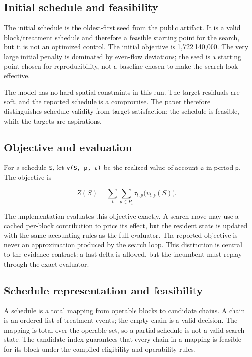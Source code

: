 \documentclass[11pt]{article}
\begin{document}
\subsection{Initial schedule and feasibility}\label{initial-schedule-and-feasibility}

The initial schedule is the oldest-first seed from the public artifact. It is a valid block/treatment schedule and therefore a feasible starting point for the search, but it is not an optimized control. The initial objective is 1,722,140,000. The very large initial penalty is dominated by even-flow deviations; the seed is a starting point chosen for reproducibility, not a baseline chosen to make the search look effective.

The model has no hard spatial constraints in this run. The target residuals are soft, and the reported schedule is a compromise. The paper therefore distinguishes schedule validity from target satisfaction: the schedule is feasible, while the targets are aspirations.

\subsection{Objective and evaluation}\label{objective-and-evaluation}

For a schedule \texttt{S}, let \texttt{v(S,\ p,\ a)} be the realized value of account \texttt{a} in period \texttt{p}. The objective is

\begin{equation}
Z(S) = \sum_{t}\sum_{p\in P_t} \tau_{t,p}\bigl(v_{t,p}(S)\bigr).
\end{equation}

The implementation evaluates this objective exactly. A search move may use a cached per-block contribution to price its effect, but the resident state is updated with the same accounting rules as the full evaluator. The reported objective is never an approximation produced by the search loop. This distinction is central to the evidence contract: a fast delta is allowed, but the incumbent must replay through the exact evaluator.

\subsection{Schedule representation and feasibility}

A schedule is a total mapping from operable blocks to candidate chains. A chain is an ordered list of
treatment events; the empty chain is a valid decision. The mapping is total over the operable set, so
a partial schedule is not a valid search state. The candidate index guarantees that every chain in a
mapping is feasible for its block under the compiled eligibility and operability rules.
\end{document}
